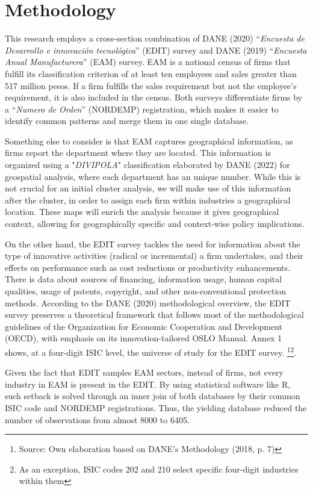 \documentclass[12pt,a4paper]{article}
\begin{document}
\section{Methodology}

This research employs a cross-section combination of DANE (2020) “\textit{Encuesta de Desarrollo e innovación tecnológica}” (EDIT) survey and DANE (2019) “\textit{Encuesta Anual Manufacturera}” (EAM) survey. EAM is a national census of firms that fulfill its classification criterion of at least ten employees and sales greater than 517 million pesos. If a firm fulfills the sales requirement but not the employee's requirement, it is also included in the census. Both surveys differentiate firms by a “\textit{Numero de Orden}” (NORDEMP) registration, which makes it easier to identify common patterns and merge them in one single database. 

Something else to consider is that EAM captures geographical information, as firms report the department where they are located. This information is organized using a "\textit{DIVIPOLA}" classification elaborated by DANE (2022) for geospatial analysis, where each department has an unique number. While this is not crucial for an initial cluster analysis, we will make use of this information after the cluster, in order to assign each firm within industries a geographical location. These maps will enrich the analysis because it gives geographical context, allowing for geographically specific and context-wise policy implications.


On the other hand, the EDIT survey tackles the need for information about the type of innovative activities (radical or incremental) a firm undertakes, and their effects on performance such as cost reductions or productivity enhancements. There is data about sources of financing, information usage, human capital qualities, usage of patents, copyright, and other non-conventional protection methods. According to the DANE (2020) methodological overview, the EDIT survey preserves a theoretical framework that follows most of the methodological guidelines of the Organization for Economic Cooperation and Development (OECD), with emphasis on its innovation-tailored OSLO Manual. Annex 1 shows, at a four-digit ISIC level, the universe of study for the EDIT survey.  \footnote{Source: Own elaboration based on DANE's Methodology (2018, p. 7)}\footnote{As an exception, ISIC codes 202 and 210 select specific four-digit industries within them}. 

Given the fact that EDIT samples EAM sectors, instead of firms, not every industry in EAM is present in the EDIT. By using statistical software like R, such setback is solved through an inner join of both databases by their common ISIC code and NORDEMP registrations. Thus, the yielding database reduced the number of observations from almost 8000 to 6405.  
\end{document}

